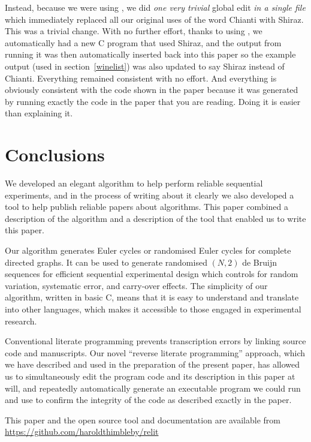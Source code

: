\documentclass[prodmode,acmtecs]{acmsmall} %
\begin{document}
Instead, because we were using , we did \emph{one very trivial\/} global edit \emph{in a single file\/} which immediately replaced all our original uses of the word Chianti with Shiraz. This was a trivial change. With no further effort, thanks to using , we automatically had a new C program that used Shiraz, and the output from running it was then automatically inserted back into this paper so the example output (used in section~\ref{winelist}) was also updated to say Shiraz instead of Chianti. Everything remained consistent with no effort. And everything is obviously consistent with the code shown in the paper because it was generated by running exactly the code in the paper that you are reading. Doing it is easier than explaining it.

\section{Conclusions}\label{conclusions}
We developed an elegant algorithm to help perform reliable sequential experiments, and in the process of writing about it clearly we also developed a tool to help publish reliable papers about algorithms. This paper combined a description of the algorithm and a description of the tool that enabled us to write this paper.

Our algorithm generates Euler cycles or randomised Euler cycles for complete directed graphs. It can be used to generate randomised $(N,2)$ de Bruijn sequences for efficient sequential experimental design which controls for random variation, systematic error, and carry-over effects. The simplicity of our algorithm, written in basic C, means that it is easy to understand and translate into other languages, which makes it accessible to those engaged in experimental research. 

Conventional literate programming prevents transcription errors by linking source code and manuscripts. Our novel ``reverse literate programming'' approach, which we have described and used in the preparation of the present paper, has allowed us to simultaneously edit the program code and its description in this paper at will, and repeatedly automatically generate an executable program we could run and use to confirm the integrity of the code as described exactly in the paper. 

This paper and the open source  tool and documentation are available from \url{https://github.com/haroldthimbleby/relit}

\end{document}
